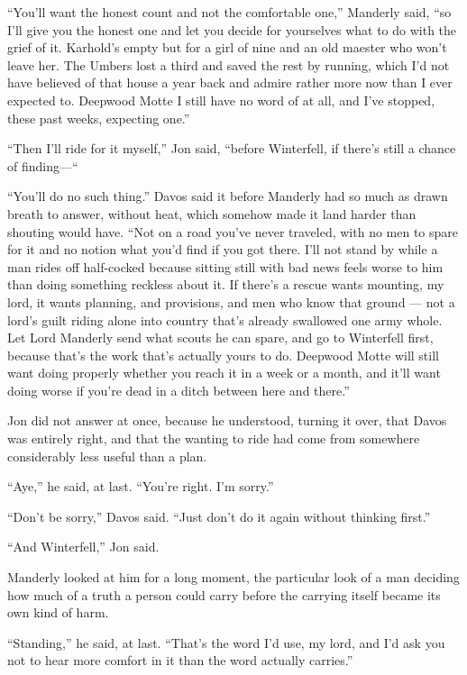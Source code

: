 “You’ll want the honest count and not the comfortable one,” Manderly said, “so I’ll give you the honest one and let you decide for yourselves what to do with the grief of it. Karhold’s empty but for a girl of nine and an old maester who won’t leave her. The Umbers lost a third and saved the rest by running, which I’d not have believed of that house a year back and admire rather more now than I ever expected to. Deepwood Motte I still have no word of at all, and I’ve stopped, these past weeks, expecting one.”

“Then I’ll ride for it myself,” Jon said, “before Winterfell, if there’s still a chance of finding—“

“You’ll do no such thing.” Davos said it before Manderly had so much as drawn breath to answer, without heat, which somehow made it land harder than shouting would have. “Not on a road you’ve never traveled, with no men to spare for it and no notion what you’d find if you got there. I’ll not stand by while a man rides off half-cocked because sitting still with bad news feels worse to him than doing something reckless about it. If there’s a rescue wants mounting, my lord, it wants planning, and provisions, and men who know that ground — not a lord’s guilt riding alone into country that’s already swallowed one army whole. Let Lord Manderly send what scouts he can spare, and go to Winterfell first, because that’s the work that’s actually yours to do. Deepwood Motte will still want doing properly whether you reach it in a week or a month, and it’ll want doing worse if you’re dead in a ditch between here and there.”

Jon did not answer at once, because he understood, turning it over, that Davos was entirely right, and that the wanting to ride had come from somewhere considerably less useful than a plan.

“Aye,” he said, at last. “You’re right. I’m sorry.”

“Don’t be sorry,” Davos said. “Just don’t do it again without thinking first.”

“And Winterfell,” Jon said.

Manderly looked at him for a long moment, the particular look of a man deciding how much of a truth a person could carry before the carrying itself became its own kind of harm.

“Standing,” he said, at last. “That’s the word I’d use, my lord, and I’d ask you not to hear more comfort in it than the word actually carries.”

\sceneBreak

